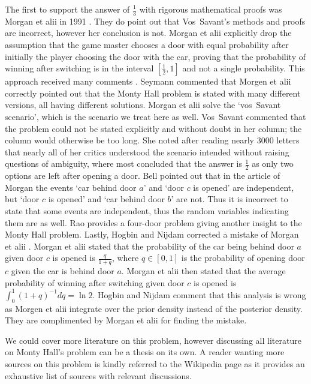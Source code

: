 \documentclass[a4paper]{report}
\theoremstyle{plain}
\theoremstyle{definition}
\theoremstyle{remark}
\numberwithin{equation}{chapter}
\DeclareMathOperator{\1}{\mathbbm{1}}
\begin{document}
The first to support the answer of $\frac{1}{3}$ with rigorous mathematical proofs was Morgan et alii in 1991 \cite{Morgan91a}. They do point out that Vos~Savant's methods and proofs are incorrect, however her conclusion is not. Morgan et alii explicitly drop the assumption that the game master chooses a door with equal probability after initially the player choosing the door with the car, proving that the probability of winning after switching is in the interval $\left[\frac{1}{2},1\right]$ and not a single probability. This approach received many comments \cite{Seymann91,Morgan91b,Savant91c,Bell92,Rao92,Hogbin10}. Seymann \cite{Seymann91} commented that Morgen et alii correctly pointed out that the Monty Hall problem is stated with many different versions, all having different solutions. Morgan et alii solve the `vos~Savant scenario', which is the scenario we treat here as well. Vos~Savant \cite{Savant91c} commented that the problem could not be stated explicitly and without doubt in her column; the column would otherwise be too long. She noted after reading nearly 3000 letters that nearly all of her critics understood the scenario intended without raising questions of ambiguity, where most concluded that the answer is $\frac{1}{2}$ as only two options are left after opening a door. Bell \cite{Bell92} pointed out that in the article of Morgan the events `car behind door $a$' and `door $c$ is opened' are independent, but `door $c$ is opened' and `car behind door $b$' are not. Thus it is incorrect to state that some events are independent, thus the random variables indicating them are as well. Rao \cite{Rao92} provides a four-door problem giving another insight to the Monty Hall problem. Lastly, Hogbin and Nijdam \cite{Hogbin10} corrected a mistake of Morgan et alii \cite{Morgan91a}. Morgan et alii stated that the probability of the car being behind door $a$ given door $c$ is opened is $\frac{q}{1+q}$, where $q\in[0,1]$ is the probability of opening door $c$ given the car is behind door $a$. Morgan et alii then stated that the average probability of winning after switching given door $c$ is opened is $\int_0^1(1+q)^{-1}dq=\ln2$. Hogbin and Nijdam comment that this analysis is wrong as Morgen et alii integrate over the prior density instead of the posterior density. They are complimented by Morgan et alii \cite{Hogbin10} for finding the mistake.

We could cover more literature on this problem, however discussing all literature on Monty Hall's problem can be a thesis on its own. A reader wanting more sources on this problem is kindly referred to the Wikipedia page \cite{WikiMonty} as it provides an exhaustive list of sources with relevant discussions.
\end{document}
